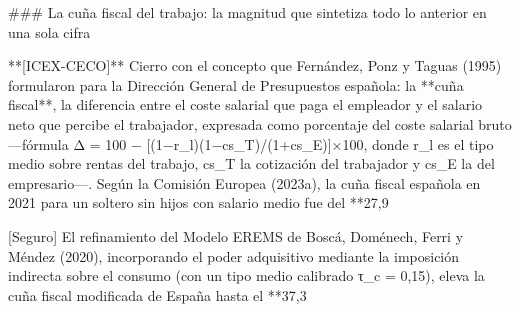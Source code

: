 \documentclass[10pt,a4paper]{article}
\begin{document}
### La cuña fiscal del trabajo: la magnitud que sintetiza todo lo anterior en una sola cifra

**[ICEX-CECO]** Cierro con el concepto que Fernández, Ponz y Taguas (1995) formularon para la Dirección General de Presupuestos española: la **cuña fiscal**, la diferencia entre el coste salarial que paga el empleador y el salario neto que percibe el trabajador, expresada como porcentaje del coste salarial bruto —fórmula Δ = 100 − [(1−r_l)(1−cs_T)/(1+cs_E)]×100, donde r_l es el tipo medio sobre rentas del trabajo, cs_T la cotización del trabajador y cs_E la del empresario—. Según la Comisión Europea (2023a), la cuña fiscal española en 2021 para un soltero sin hijos con salario medio fue del **27,9%

[Seguro] El refinamiento del Modelo EREMS de Boscá, Doménech, Ferri y Méndez (2020), incorporando el poder adquisitivo mediante la imposición indirecta sobre el consumo (con un tipo medio calibrado τ_c = 0,15), eleva la cuña fiscal modificada de España hasta el **37,3%
\end{document}
